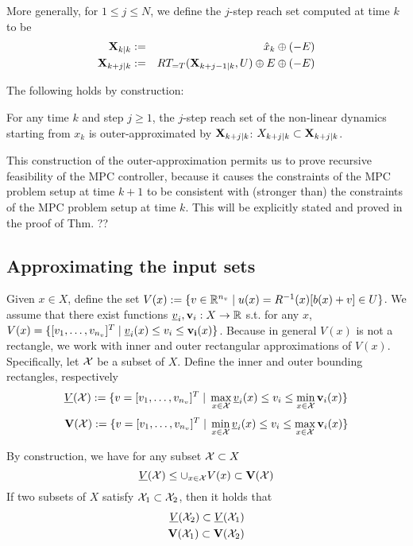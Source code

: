 More generally, for $1 \leq j \leq N$, we define the $j$-step reach set computed at time $k$ to be
\begin{eqnarray}
\label{eq:def Xkj}
\mathbf{X}_{k|k} &:=&   \hat{x}_{k} \oplus (-E) 
\nonumber
\\
\mathbf{X}_{k+j|k} & :=& RT_{=T}(\mathbf{X}_{k+j-1|k},U) \oplus E \oplus (-E) 
\end{eqnarray}

The following holds by construction:
\begin{lemma}
	\label{lemma:xreach}
	For any time $k$ and step $j \geq 1$, the $j$-step reach set of the non-linear dynamics starting from $x_k$ is outer-approximated by $\mathbf{X}_{k+j|k}$:
	$X_{k+j|k} \subset \mathbf{X}_{k+j|k}$.
\end{lemma}

This construction of the outer-approximation permits us to prove recursive feasibility of the MPC controller,  because it causes the constraints of the MPC problem setup at time $k+1$ to be consistent with (stronger than) the constraints of the MPC problem setup at time $k$.
This will be explicitly stated and proved in the proof of Thm. ??

\subsection{Approximating the input sets}
\label{sec:approx input sets}
Given $x \in X$, define the set $V(x) := \{v \in \mathbb{R}^{n_v} \;|\; u(x) = R^{-1}(x)[b(x)+v] \in U\}$.
We assume that there exist functions $\underline{v}_i, \mathbf{v}_i: X \rightarrow \mathbb{R}$ s.t. for any $x$, $V(x) = \{[v_1,\ldots,v_{n_v}]^T \;|\; \underline{v}_i(x) \leq v_i \leq \mathbf{v_i}(x) \}$.
Because in general $V(x)$ is not a rectangle, we work with inner and outer rectangular approximations of $V(x)$.
Specifically, let $\mathcal{X}$ be a subset of $X$.
Define the inner and outer bounding rectangles, respectively
\[\underline{V}(\mathcal{X}) := \{v=[v_1,\ldots,v_{n_v}]^T \;|\; \max_{x\in \mathcal{X}} \underline{v}_i(x)  \leq v_i \leq \min_{x \in \mathcal{X}} \mathbf{v}_i(x) \} \]
\[\mathbf{V}(\mathcal{X}) := \{v=[v_1,\ldots,v_{n_v}]^T \;|\; \min_{x\in \mathcal{X}} \underline{v}_i(x)  \leq v_i \leq \max_{x \in \mathcal{X}} \mathbf{v}_i(x) \} \]

By construction, we have for any subset $\mathcal{X} \subset X$
\begin{equation}
\label{eq:Vbounds}
\underline{V}(\mathcal{X}) \leq \cup_{x \in \mathcal{X}} V(x) \subset \mathbf{V}(\mathcal{X})
\end{equation}
If two subsets of $X$ satisfy $\mathcal{X}_1 \subset \mathcal{X}_2$, then it holds that 
\begin{eqnarray}
\label{eq:V inclusions}
\underline{V}(\mathcal{X}_2) \subset \underline{V}(\mathcal{X}_1)
\nonumber
\\
\mathbf{V}(\mathcal{X}_1) \subset \mathbf{V}(\mathcal{X}_2)
\end{eqnarray}


